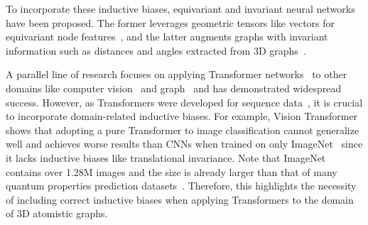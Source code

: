 To incorporate these inductive biases, equivariant and invariant neural networks have been proposed.
The former leverages geometric tensors like vectors for equivariant node features~\citep{tfn, 3dsteerable, kondor2018clebsch, se3_transformer, nequip, segnn, allergo}, and the latter augments graphs with invariant information such as distances and angles extracted from 3D graphs~\citep{schnet, dimenet, dimenet_pp, spherenet, gemnet}.

\vspace{-1.5mm}
A parallel line of research focuses on applying Transformer networks~\citep{transformer} to other domains like computer vision~\citep{detr, vit, deit} and graph~\citep{generalization_transformer_graphs, spectral_attention, graphormer, graphormer_3d} and has demonstrated widespread success.
However, as Transformers were developed for sequence data~\citep{bert, wav2vec2, gpt3}, it is crucial to incorporate domain-related inductive biases. %
For example, Vision Transformer~\citep{vit} shows that adopting a pure Transformer to image classification cannot generalize well and achieves worse results than CNNs when trained on only ImageNet~\citep{imagenet} since it lacks inductive biases like translational invariance.
Note that ImageNet contains over 1.28M images and the size is already larger than that of many quantum properties prediction datasets~\citep{qm9_2, md17_1, oc20}.
Therefore, this highlights the necessity of including correct inductive biases when applying Transformers to the domain of 3D atomistic graphs.


